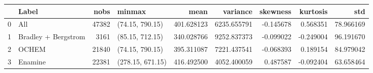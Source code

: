\documentclass{standalone}
\begin{document}
\begin{tabular}{llrlrrrrr}
\toprule
{} &                Label &   nobs &            minmax &        mean &     variance &  skewness &  kurtosis &        std \\
\midrule
0 &                  All &  47382 &   (74.15, 790.15) &  401.628123 &  6235.655791 & -0.145678 &  0.568351 &  78.966169 \\
1 &  Bradley + Bergstrom &   3161 &   (85.15, 712.15) &  340.028766 &  9252.837373 & -0.099022 & -0.249004 &  96.191670 \\
2 &                OCHEM &  21840 &   (74.15, 790.15) &  395.311087 &  7221.437541 & -0.068393 &  0.189154 &  84.979042 \\
3 &              Enamine &  22381 &  (278.15, 671.15) &  416.492500 &  4052.400059 &  0.487587 & -0.092404 &  63.658464 \\
\bottomrule
\end{tabular}
\end{document}
